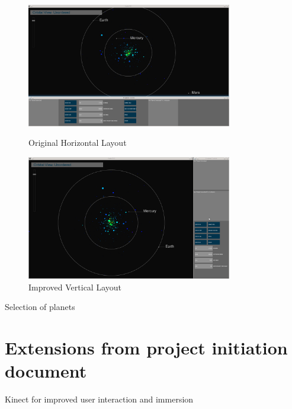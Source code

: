 \begin{figure}[h!]
  \centering
      \includegraphics[width=0.8\textwidth]{images/layout_horizontal.jpg}
  \caption{Original Horizontal Layout}  
        \includegraphics[width=0.8\textwidth]{images/layout_vertical.jpg}
  \caption{Improved Vertical Layout}
\end{figure}

Selection of planets
\section{Extensions from project initiation document}
Kinect for improved user interaction and immersion
